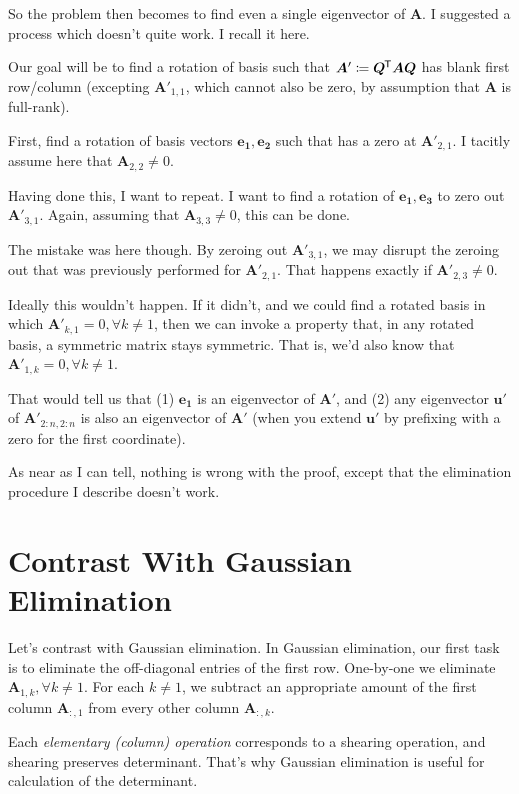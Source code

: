 \documentclass[11pt, oneside]{amsart}
\newcommand{\define}[1]{\textit{#1}}
\newcommand{\mtx}[1]{\bm{#1}}
\newcommand*{\tran}{^{\mkern-1.5mu\mathsf{T}}}
\renewcommand{\vec}[1]{\mathbf{#1}}
\newcommand{\bvec}[1]{\vec{e_{#1}}}
\newcommand{\mtxA}{\mtx{A}}
\newcommand{\mtxQ}{\mtx{Q}}
\begin{document}
So the problem then becomes to find even a single eigenvector of
$\mtxA$. I suggested a process which doesn't quite work. I recall it
here.

Our goal will be to find a rotation of basis such that $\mtxA' \coloneqq
\mtxQ\tran \mtxA \mtxQ$ has blank first row/column (excepting
$\mtxA'_{1, 1}$, which cannot also be zero, by assumption that $\mtxA$
is full-rank).

First, find a rotation of basis vectors $\bvec{1}, \bvec{2}$ such that
has a zero at $\mtxA'_{2, 1}$. I tacitly assume here that $\mtxA_{2, 2}
\ne 0$.

Having done this, I want to repeat. I want to find a rotation of
$\bvec{1}, \bvec{3}$ to zero out $\mtxA'_{3, 1}$. Again, assuming that
$\mtxA_{3, 3} \ne 0$, this can be done.

The mistake was here though. By zeroing out $\mtxA'_{3, 1}$, we may
disrupt the zeroing out that was previously performed for $\mtxA'_{2,
1}$. That happens exactly if $\mtxA'_{2, 3} \ne 0$.

Ideally this wouldn't happen. If it didn't, and we could find a rotated
basis in which $\mtxA'_{k, 1} = 0, \forall k\ne 1$, then we can invoke a
property that, in any rotated basis, a symmetric matrix stays symmetric.
That is, we'd also know that $\mtxA'_{1, k} = 0, \forall k\ne 1$.

That would tell us that (1) $\bvec{1}$ is an eigenvector of $\mtxA'$,
and (2) any eigenvector $\vec{u}'$ of $\mtxA'_{2:n, 2:n}$ is also an
eigenvector of $\mtxA'$ (when you extend $\vec{u}'$ by prefixing with a
zero for the first coordinate).

As near as I can tell, nothing is wrong with the proof, except that the
elimination procedure I describe doesn't work.

\section{Contrast With Gaussian Elimination}

Let's contrast with Gaussian elimination. In Gaussian elimination, our
first task is to eliminate the off-diagonal entries of the first row.
One-by-one we eliminate $\mtxA_{1, k}, \forall k \ne 1$. For each $k \ne
1$, we subtract an appropriate amount of the first column $\mtxA_{:, 1}$
from every other column $\mtxA_{:, k}$.

Each \define{elementary (column) operation} corresponds to a shearing
operation, and shearing preserves determinant. That's why Gaussian
elimination is useful for calculation of the determinant.
\end{document}
